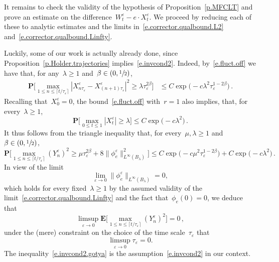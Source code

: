 \documentclass[11pt]{article} %
\numberwithin{equation}{section}
\theoremstyle{definition}
\newcommand{\eps}{\varepsilon}
\newcommand{\ep}{\eps}
\begin{document}
\smallskip

It remains to check the validity of the hypothesis of Proposition~\ref{p.MFCLT} and prove an estimate on the difference~$W^\ep_t - e\cdot X^{\ep}_t$. 
We proceed by reducing each of these to analytic estimates and the limits in~\eqref{e.corrector.qualbound.L2} and~\eqref{e.corrector.qualbound.Linfty}.

\smallskip

Luckily, some of our work is actually already done, since Proposition~\ref{p.Holder.trajectories} implies~\eqref{e.invcond2}. Indeed, by~\eqref{e.fluct.off} we have that, for any~$\lambda\geq 1$ and~$\beta \in (0,\sfrac12)$, 
\begin{align*}
\mathbf{P}
\biggl[ 
\max_{ 1 \leq n \leq \lceil t/\tau_\ep\rceil } 
|X^\ep_{n\tau_\ep} - X^\ep_{(n+1)\tau_\ep } |^2
\geq 
\lambda
\tau_\ep^{2\beta}
\biggr] 
&
\leq
C\exp \bigl( - c\lambda^2 \tau_\ep^{1-2\beta} \bigr) 
\,.
\end{align*}
Recalling that~$X^\ep_0 = 0$, the bound~\eqref{e.fluct.off} with~$r=1$ also implies,  that, for every~$\lambda \geq 1$,
\begin{equation}
\label{e.u.stuck.bro}
\mathbf{P}\biggl[ \max_{ 0 \leq t \leq 1} |X^\ep_{t} | \geq \lambda \biggr]
\leq 
C \exp \bigl(-c\lambda^2\bigr)\,.
\end{equation}
It thus follows from the triangle inequality that, for every~$\mu,\lambda\geq 1$ and~$\beta \in(0,\sfrac12)$,  
\begin{equation}
\label{e.max.Yepn.bonk}
\mathbf{P} 
\biggl[ 
\max_{ 1 \leq n \leq \lceil t/\tau_\ep\rceil } 
(Y^\ep_n)^2
\geq \mu \tau_\ep^{2\beta} + 8\| \phi^\ep_e\|_{L^\infty(B_\lambda)}^2
\biggr]
\leq 
C \exp \bigl( -c\mu^2 \tau_\ep^{1-2\beta} \bigr) 
+
C \exp \bigl( -c\lambda^2  \bigr)
\,.
\end{equation}
In view of the limit
\begin{equation}
\label{e.phieep.limit.Linfty}
\lim_{\ep \to 0} \| \phi_e^\ep\|_{L^\infty(B_\lambda)}
= 0, 
\end{equation}
which holds for every fixed~$\lambda \geq 1$ by the assumed validity of the limit~\eqref{e.corrector.qualbound.Linfty} and the fact that~$\phi_e(0)=0$, 
we deduce that 
\begin{equation}
\label{e.invcond2.gotya}
\limsup_{\ep \to 0} 
\mathbf{E} 
\biggl[ 
\max_{ 1 \leq n \leq \lceil t/\tau_\ep\rceil } 
(Y^\ep_n)^2
\biggr]
= 0 
\,,
\end{equation}
under the (mere) constraint on the choice of the time scale~$\tau_\ep$ that
\begin{equation}
\label{e.tau.ep.constraint}
\limsup_{\ep \to 0} \tau_\ep = 0. 
\end{equation}
The inequality~\eqref{e.invcond2.gotya} is the assumption~\eqref{e.invcond2} in our context.  
\end{document}
